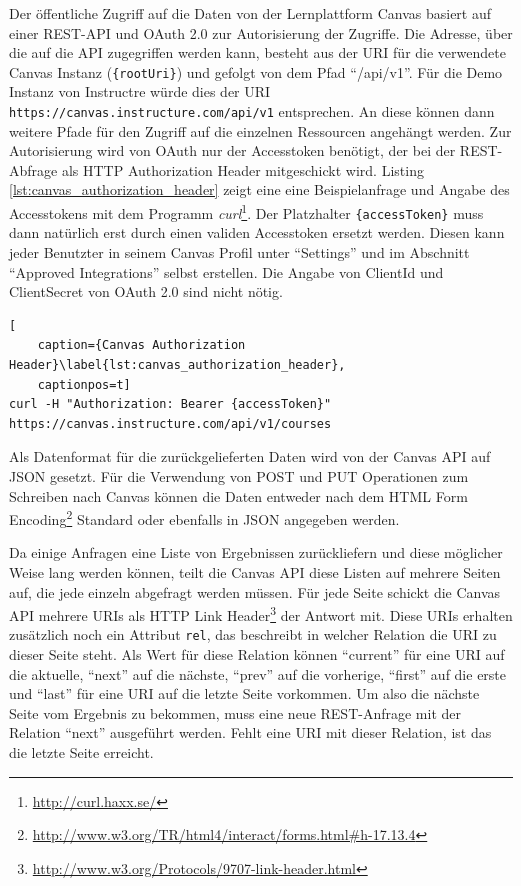 Der öffentliche Zugriff auf die Daten von der Lernplattform Canvas basiert auf einer REST-API und OAuth 2.0 zur Autorisierung der Zugriffe. Die Adresse, über die auf die API zugegriffen werden kann, besteht aus der URI für die verwendete Canvas Instanz (\texttt{\{rootUri\}}) und gefolgt von dem Pfad \enquote{/api/v1}. Für die Demo Instanz von Instructre würde dies der URI \texttt{https://canvas.instructure.com/api/v1} entsprechen. An diese können dann weitere Pfade für den Zugriff auf die einzelnen Ressourcen angehängt werden. Zur Autorisierung wird von OAuth nur der Accesstoken benötigt, der bei der REST-Abfrage als HTTP Authorization Header mitgeschickt wird. Listing \ref{lst:canvas_authorization_header} zeigt eine eine Beispielanfrage und Angabe des Accesstokens mit dem Programm \emph{curl}\footnote{\url{http://curl.haxx.se/}}. Der Platzhalter \texttt{\{accessToken\}} muss dann natürlich erst durch einen validen Accesstoken ersetzt werden. Diesen kann jeder Benutzter in seinem Canvas Profil unter \enquote{Settings} und im Abschnitt \enquote{Approved Integrations} selbst erstellen. Die Angabe von ClientId und ClientSecret von OAuth 2.0 sind nicht nötig.

\begin{lstlisting}[
    caption={Canvas Authorization Header}\label{lst:canvas_authorization_header},
    captionpos=t]
curl -H "Authorization: Bearer {accessToken}" https://canvas.instructure.com/api/v1/courses
\end{lstlisting}

Als Datenformat für die zurückgelieferten Daten wird von der Canvas API auf JSON gesetzt. Für die Verwendung von POST und PUT Operationen zum Schreiben nach Canvas können die Daten entweder nach dem HTML Form Encoding\footnote{\url{http://www.w3.org/TR/html4/interact/forms.html\#h-17.13.4}} Standard oder ebenfalls in JSON angegeben werden. 

Da einige Anfragen eine Liste von Ergebnissen zurückliefern und diese möglicher Weise lang werden können, teilt die Canvas API diese Listen auf mehrere Seiten auf, die jede einzeln abgefragt werden müssen. Für jede Seite schickt die Canvas API mehrere URIs als HTTP Link Header\footnote{\url{http://www.w3.org/Protocols/9707-link-header.html}} der Antwort mit. Diese URIs erhalten zusätzlich noch ein Attribut \texttt{rel}, das beschreibt in welcher Relation die URI zu dieser Seite steht.  Als Wert für diese Relation können \enquote{current} für eine URI auf die aktuelle, \enquote{next} auf die nächste, \enquote{prev} auf die vorherige, \enquote{first} auf die erste und \enquote{last} für eine URI auf die letzte Seite vorkommen. Um also die nächste Seite vom Ergebnis zu bekommen, muss eine neue REST-Anfrage mit der Relation \enquote{next} ausgeführt werden. Fehlt eine URI mit dieser Relation, ist das die letzte Seite erreicht. 


